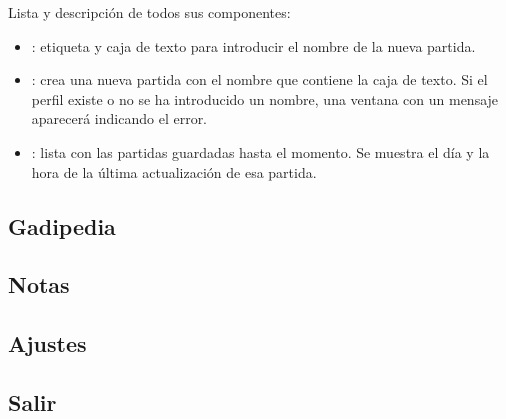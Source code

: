             Lista y descripción de todos sus componentes:
            \begin{itemize}
            \item {}: etiqueta y caja de texto para introducir el nombre de la nueva partida.
            \item {}: crea una nueva partida con el nombre que contiene la caja de texto. Si el perfil existe o no se ha introducido un nombre, una ventana con un mensaje aparecerá indicando el error.
            \item {}: lista con las partidas guardadas hasta el momento. Se muestra el día y la hora de la última actualización de esa partida.
            \end{itemize}
            
            \newpage
            \subsection{Gadipedia}
            
            
            \newpage
            \subsection{Notas}
            
            
            \newpage
            \subsection{Ajustes}
            
            
            \newpage
            \subsection{Salir}
